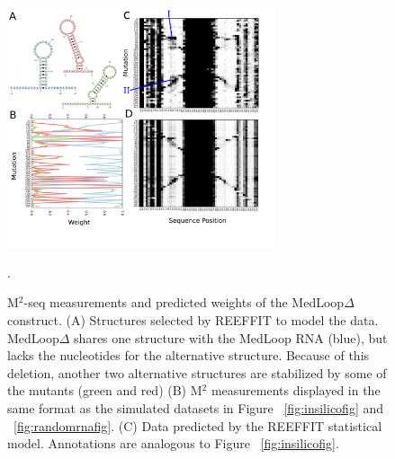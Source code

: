 \documentclass[12pt]{article}
\begin{document}
\begin{figure}[here]
\includegraphics[width=0.7\textwidth]{figures/medloopdelta.png}
\caption{M$^2$-seq measurements and predicted weights of the MedLoop$\Delta$ construct. (A) Structures selected by REEFFIT to model the data. MedLoop$\Delta$ shares one structure with the MedLoop RNA (blue), but lacks the nucleotides for the alternative structure. Because of this deletion, another two alternative structures are stabilized by some of the mutants (green and red) (B) M$^2$ measurements displayed in the same format as the simulated datasets in Figure ~\ref{fig:insilicofig} and ~\ref{fig:randomrnafig}. (C) Data predicted by the REEFFIT statistical model. Annotations are analogous to Figure ~\ref{fig:insilicofig}.}.
\label{fig:medloopdeltafig}
\end{figure}
\end{document}
